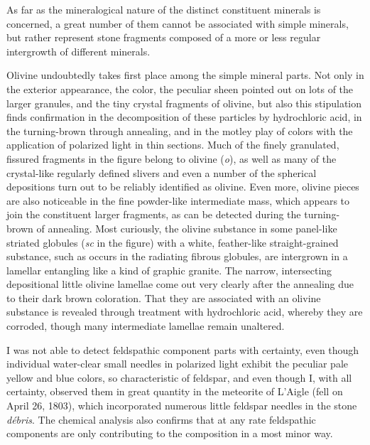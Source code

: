 \documentclass[a4paper, 12pt, oneside]{article}
\begin{document}
As far as the mineralogical nature of the distinct constituent minerals is concerned, a great number of them cannot be associated with simple minerals, but rather represent stone fragments composed of a more or less regular intergrowth of different minerals.

Olivine undoubtedly takes first place among the simple mineral parts. Not only in the exterior appearance, the color, the peculiar sheen pointed out on lots of the larger granules, and the tiny crystal fragments of olivine, but also this stipulation finds confirmation in the decomposition of these particles by hydrochloric acid, in the turning-brown through annealing, and in the motley play of colors with the application of polarized light in thin sections. Much of the finely granulated, fissured fragments in the figure belong to olivine (\emph{o}), as well as many of the crystal-like regularly defined slivers and even a number of the spherical depositions turn out to be reliably identified as olivine. Even more, olivine pieces are also noticeable in the fine powder-like intermediate mass, which appears to join the constituent larger fragments, as can be detected during the turning-brown of annealing. Most curiously, the olivine substance in some panel-like striated globules (\emph{sc} in the figure) with a white, feather-like straight-grained substance, such as occurs in the radiating fibrous globules, are intergrown in a lamellar entangling like a kind of graphic granite. The narrow, intersecting depositional little olivine lamellae come out very clearly after the annealing due to their dark brown coloration. That they are associated with an olivine substance is revealed through treatment with hydrochloric acid, whereby they are corroded, though many intermediate lamellae remain unaltered.

I was not able to detect feldspathic component parts with certainty, even though individual water-clear small needles in polarized light exhibit the peculiar pale yellow and blue colors, so characteristic of feldspar, and even though I, with all certainty, observed them in great quantity in the meteorite of L'Aigle (fell on April 26, 1803), which incorporated numerous little feldspar needles in the stone \emph{débris}. The chemical analysis also confirms that at any rate feldspathic components are only contributing to the composition in a most minor way.
\end{document}
